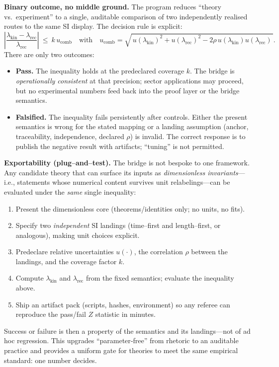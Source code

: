 \documentclass[11pt]{article}
\begin{document}
\noindent\textbf{Binary outcome, no middle ground.}
The program reduces “theory vs.\ experiment” to a single, auditable comparison of two independently realised routes to the same SI display. The decision rule is explicit:
\[
\left|\frac{\lambda_{\mathrm{kin}}-\lambda_{\mathrm{rec}}}{\lambda_{\mathrm{rec}}}\right|
\ \le\
k\,u_{\mathrm{comb}}
\quad\text{with}\quad
u_{\mathrm{comb}}
=\sqrt{\,u(\lambda_{\mathrm{kin}})^{2}+u(\lambda_{\mathrm{rec}})^{2}-2\rho\,u(\lambda_{\mathrm{kin}})u(\lambda_{\mathrm{rec}})\,}.
\]
There are only two outcomes:
\begin{itemize}
  \item \textbf{Pass.} The inequality holds at the predeclared coverage \(k\). The bridge is \emph{operationally consistent} at that precision; sector applications may proceed, but no experimental numbers feed back into the proof layer or the bridge semantics.
  \item \textbf{Falsified.} The inequality fails persistently after controls. Either the present semantics is wrong for the stated mapping or a landing assumption (anchor, traceability, independence, declared \(\rho\)) is invalid. The correct response is to publish the negative result with artifacts; “tuning” is not permitted.
\end{itemize}

\medskip
\noindent\textbf{Exportability (plug–and–test).}
The bridge is not bespoke to one framework. Any candidate theory that can surface its inputs as \emph{dimensionless invariants}—i.e., statements whose numerical content survives unit relabelings—can be evaluated under the \emph{same} single inequality:
\begin{enumerate}
  \item Present the dimensionless core (theorems/identities only; no units, no fits).
  \item Specify two \emph{independent} SI landings (time–first and length–first, or analogous), making unit choices explicit.
  \item Predeclare relative uncertainties \(u(\cdot)\), the correlation \(\rho\) between the landings, and the coverage factor \(k\).
  \item Compute \(\lambda_{\mathrm{kin}}\) and \(\lambda_{\mathrm{rec}}\) from the fixed semantics; evaluate the inequality above.
  \item Ship an artifact pack (scripts, hashes, environment) so any referee can reproduce the pass/fail \(Z\) statistic in minutes.
\end{enumerate}
Success or failure is then a property of the semantics and its landings—not of ad hoc regression. This upgrades “parameter‑free” from rhetoric to an auditable practice and provides a uniform gate for theories to meet the same empirical standard: one number decides.
\end{document}
